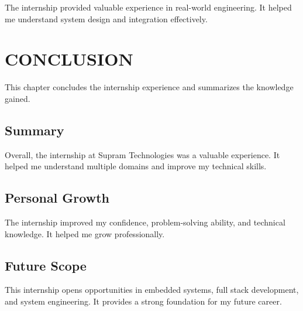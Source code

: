 \documentclass[12pt,a4paper]{report}
\begin{document}
The internship provided valuable experience in real-world engineering. It helped me understand system design and integration effectively.




\chapter{CONCLUSION}
\label{ch:conclusion}


This chapter concludes the internship experience and summarizes the knowledge gained.




\section{Summary}

Overall, the internship at Supram Technologies was a valuable experience. It helped me understand multiple domains and improve my technical skills.


\section{Personal Growth}

The internship improved my confidence, problem-solving ability, and technical knowledge. It helped me grow professionally.


\section{Future Scope}

This internship opens opportunities in embedded systems, full stack development, and system engineering. It provides a strong foundation for my future career.
\end{document}
